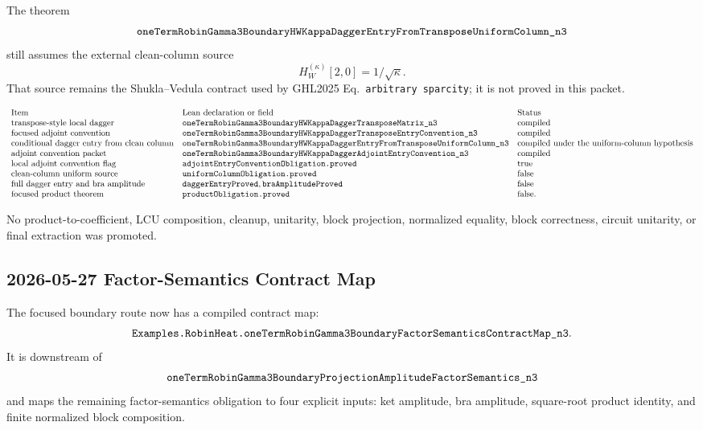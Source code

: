 The theorem
\[
  \texttt{oneTermRobinGamma3BoundaryHWKappaDaggerEntryFromTransposeUniformColumn\_n3}
\]
still assumes the external clean-column source
\[
  H_W^{(\kappa)}[2,0] = 1/\sqrt{\kappa}.
\]
That source remains the Shukla--Vedula contract used by GHL2025
Eq.~\texttt{arbitrary sparcity}; it is not proved in this packet.

\[
\begin{array}{lll}
\text{Item} & \text{Lean declaration or field} & \text{Status}\\
\text{transpose-style local dagger} &
\texttt{oneTermRobinGamma3BoundaryHWKappaDaggerTransposeMatrix\_n3} &
\text{compiled}\\
\text{focused adjoint convention} &
\texttt{oneTermRobinGamma3BoundaryHWKappaDaggerTransposeEntryConvention\_n3} &
\text{compiled}\\
\text{conditional dagger entry from clean column} &
\texttt{oneTermRobinGamma3BoundaryHWKappaDaggerEntryFromTransposeUniformColumn\_n3} &
\text{compiled under the uniform-column hypothesis}\\
\text{adjoint convention packet} &
\texttt{oneTermRobinGamma3BoundaryHWKappaDaggerAdjointEntryConvention\_n3} &
\text{compiled}\\
\text{local adjoint convention flag} &
\texttt{adjointEntryConventionObligation.proved} & \text{true}\\
\text{clean-column uniform source} &
\texttt{uniformColumnObligation.proved} & \text{false}\\
\text{full dagger entry and bra amplitude} &
\texttt{daggerEntryProved}, \texttt{braAmplitudeProved} & \text{false}\\
\text{focused product theorem} &
\texttt{productObligation.proved} & \text{false}.
\end{array}
\]

No product-to-coefficient, LCU composition, cleanup, unitarity, block
projection, normalized equality, block correctness, circuit unitarity, or
final extraction was promoted.

\subsection{2026-05-27 Factor-Semantics Contract Map}

The focused boundary route now has a compiled contract map:
\[
  \texttt{Examples.RobinHeat.oneTermRobinGamma3BoundaryFactorSemanticsContractMap\_n3}.
\]
It is downstream of
\[
  \texttt{oneTermRobinGamma3BoundaryProjectionAmplitudeFactorSemantics\_n3}
\]
and maps the remaining factor-semantics obligation to four explicit inputs:
ket amplitude, bra amplitude, square-root product identity, and finite
normalized block composition.

